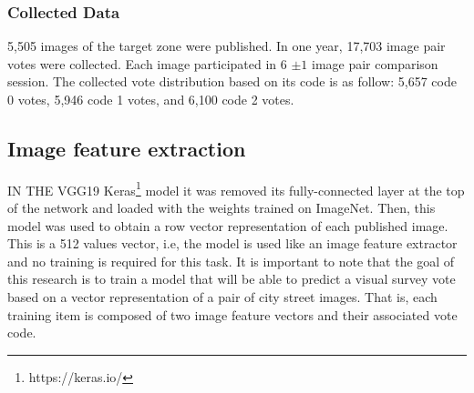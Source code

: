 \documentclass{llncs}
\begin{document}
\subsubsection{Collected Data}
5,505 images of the target zone were published. In one year, 17,703 image pair votes were collected. Each image participated in 6 $\pm 1$ image pair comparison session. The collected vote distribution based on its code is as follow: 5,657 code 0 votes, 5,946 code 1 votes, and 6,100 code 2 votes. 



\subsection{Image feature extraction} 
IN THE VGG19 Keras\footnote{https://keras.io/} model it was removed its  fully-connected layer at the top of the network and loaded with the weights trained on ImageNet. Then, this model was used to obtain a row vector representation of each published image. This is a 512 values vector, i.e, the model is used like an image feature extractor and no training is required for this task. It is important to note that the goal of this research is to train a model that will be able to predict a visual survey vote based on a vector representation of a pair of city street images. That is, each training item is composed of two image feature vectors and their associated vote code.
\end{document}
